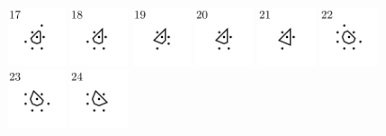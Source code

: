 \documentclass[text.tex]{subfiles}
\begin{document}
\begin{figure}[h!]
\includegraphics[width=0.1363\textwidth]{img/results/octagon_concat/octagon_100000_(1_0alpha_1)_017.pdf}
\includegraphics[width=0.1363\textwidth]{img/results/octagon_concat/octagon_100000_(1_0alpha_1)_018.pdf}
\includegraphics[width=0.1363\textwidth]{img/results/octagon_concat/octagon_100000_(1_0alpha_1)_019.pdf}
\includegraphics[width=0.1363\textwidth]{img/results/octagon_concat/octagon_100000_(1_0alpha_1)_020.pdf}
\includegraphics[width=0.1363\textwidth]{img/results/octagon_concat/octagon_100000_(1_0alpha_1)_021.pdf}
\includegraphics[width=0.1363\textwidth]{img/results/octagon_concat/octagon_100000_(1_0alpha_1)_022.pdf}
\includegraphics[width=0.1363\textwidth]{img/results/octagon_concat/octagon_100000_(1_0alpha_1)_023.pdf}
\includegraphics[width=0.1363\textwidth]{img/results/octagon_concat/octagon_100000_(1_0alpha_1)_024.pdf}

\end{figure}
\end{document}

